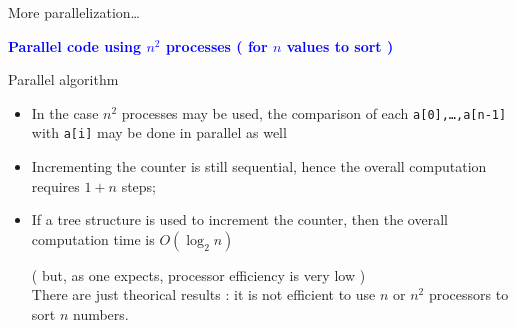 \documentclass[compress,10pt,aspectratio=169]{beamer}
\begin{document}
\begin{frame}[fragile]{More parallelization\ldots}
  \scriptsize
  \begin{center}
    \textcolor{blue}{\bf Parallel code using $n^{2}$ processes ( for $n$ values to sort )}
  \end{center}
  \begin{block}{Parallel algorithm}
    \begin{itemize}
    \item In the case $n^{2}$ processes may be used, the comparison of each
      \texttt{a[0],\ldots,a[n-1]} with \texttt{a[i]} may be done in parallel as well
    \item Incrementing the counter is still sequential, hence the overall computation requires $1+n$ steps;
    \item If a tree structure is used to increment the counter, then the overall
      computation time is $O(\log_{2} n)$
      \begin{multicols}{2}
        
      \begin{minipage}{0.4\textwidth}
      \end{minipage}

      ( but, as one expects, processor efficiency
      is very low )\\[2mm]
      There are just theorical results : it is not efficient to use $n$ or $n^{2}$
      processors to sort $n$ numbers.
      \end{multicols}
      
      \end{itemize}
  \end{block}
\end{frame}
\end{document}
